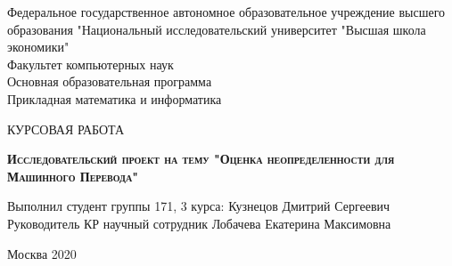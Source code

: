 \begin{titlepage}
\newpage

\begin{center}
Федеральное государственное автономное образовательное учреждение высшего образования "Национальный исследовательский университет "Высшая школа экономики"
\\
\medskip
Факультет компьютерных наук \\
Основная образовательная программа \\
Прикладная математика и информатика \\
\end{center}

\vspace{8em}

\begin{center}
\Large КУРСОВАЯ РАБОТА \\
\end{center}

\vspace{2em}

\begin{center}
\textsc{\textbf{
Исследовательский проект на тему
\linebreak
"Оценка неопределенности для Машинного Перевода"}}
\end{center}

\vspace{6em}



\newbox{\lbox}
\newlength{\maxl}
\setlength{\maxl}{\wd\lbox}
\hfill\parbox{17cm}{
\hspace*{5cm}\hspace*{-5cm}Выполнил студент группы 171, 3 курса: \hfill Кузнецов Дмитрий Сергеевич\\
\hspace*{5cm}\hspace*{-5cm}Руководитель КР\hfill 
научный сотрудник Лобачева Екатерина Максимовна\\
}


\vspace{\fill}

\begin{center}
Москва 2020
\end{center}

\end{titlepage}